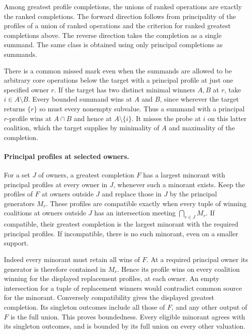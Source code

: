 Among greatest profile completions, the unions of ranked operations
are exactly the ranked completions. The forward direction follows
from principality of the profiles of a union of ranked operations
and the criterion for ranked greatest completions above. The
reverse direction takes the completion as a single summand.
The same class is obtained using only principal completions
as summands.

There is a common missed mark even when the summands are allowed
to be arbitrary core operations below the target with a principal
profile at just one specified owner $r$. If the target has two
distinct minimal winners $A,B$ at $r$, take $i\in A\setminus B$.
Every bounded summand wins at $A$ and $B$, since wherever the
target returns $\{r\}$ so must every nonempty subvalue. Thus a
summand with a principal $r$-profile wins at $A\cap B$ and hence
at $A\setminus\{i\}$. It misses the probe at $i$ on this latter
coalition, which the target supplies by minimality of $A$ and
maximality of the completion.

\paragraph{Principal profiles at selected owners.}
For a set $J$ of owners, a greatest completion $F$ has a
largest minorant with principal profiles at every owner in
$J$, whenever such a minorant exists. Keep the profiles of
$F$ at owners outside $J$ and replace those in $J$ by the
principal generators $M_r$. These profiles are compatible
exactly when every tuple of winning coalitions at owners
outside $J$ has an intersection meeting $\bigcap_{r\in J}M_r$.
If compatible, their greatest completion is the largest
minorant with the required principal profiles. If incompatible,
there is no such minorant, even on a smaller support.

Indeed every minorant must retain all wins of $F$. At a
required principal owner its generator is therefore contained
in $M_r$. Hence its profile wins on every coalition winning
for the displayed replacement profiles, at each owner.
An empty intersection for a tuple of replacement winners
would contradict common source for the minorant. Conversely
compatibility gives the displayed greatest completion. Its
singleton outcomes include all those of $F$, and any other
output of $F$ is the full union. This proves boundedness.
Every eligible minorant agrees with its singleton outcomes,
and is bounded by its full union on every other valuation.

